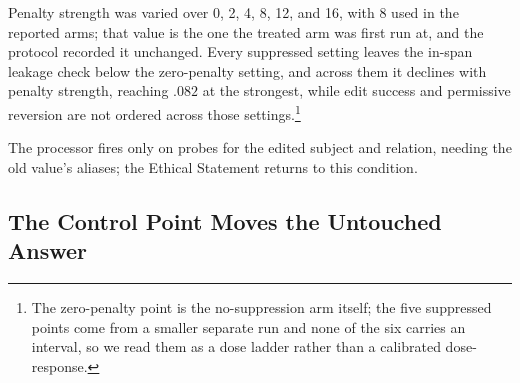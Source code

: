 \documentclass[letterpaper]{article} %
\begin{document}
Penalty strength was varied over 0, 2, 4, 8, 12, and 16, with 8 used in the reported arms; that value is the one the treated arm was first run at, and the protocol recorded it unchanged.  Every suppressed setting leaves the in-span leakage check below the zero-penalty setting, and across them it declines with penalty strength, reaching \(.082\) at the strongest, while edit success and permissive reversion are not ordered across those settings.\footnote{The zero-penalty point is the no-suppression arm itself; the five suppressed points come from a smaller separate run and none of the six carries an interval, so we read them as a dose ladder rather than a calibrated dose-response.} %

The processor fires only on probes for the edited subject and relation, needing the old value's aliases; the Ethical Statement returns to this condition.

\subsection{The Control Point Moves the Untouched Answer}
\label{sec:control-results}
\end{document}
